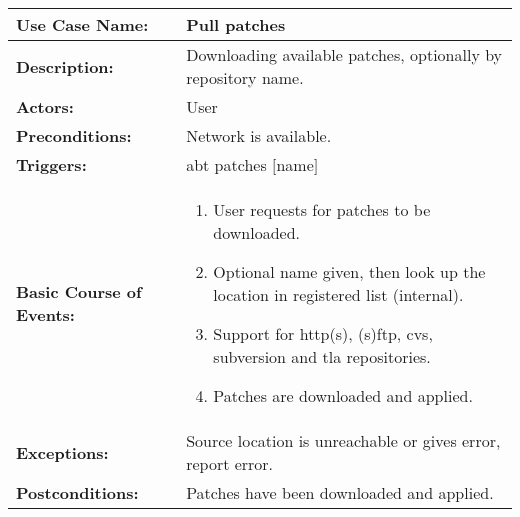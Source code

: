 
\begin{tabularx}{\linewidth}{|l|X|}
\hline
\textbf{Use Case Name:} & \textbf{Pull patches} \\
\hline
\textbf{Description:} & 
Downloading available patches, optionally by repository name. \\
\hline
\textbf{Actors:} & User \\
\hline
\textbf{Preconditions:} & 
Network is available. \\
\hline
\textbf{Triggers:} & abt patches $[$name$]$  \\
\hline
\textbf{Basic Course of Events:} & 
\begin{minipage}{\linewidth} 
  \vspace{0.05em}
  \begin{enumerate}
    \item User requests for patches to be downloaded.
    \item Optional name given, then look up the location in registered list (internal).
    \item Support for http(s), (s)ftp, cvs, subversion and tla repositories.
    \item Patches are downloaded and applied.
  \end{enumerate}
  \vspace{0.05em}
\end{minipage}
\\
\hline
\textbf{Exceptions:} & 
Source location is unreachable or gives error, report error. \\
\hline 
\textbf{Postconditions:} &
Patches have been downloaded and applied.
\\
\hline
\end{tabularx}


